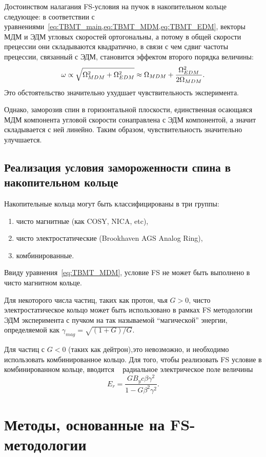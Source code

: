 Достоинством налагания FS-условия на пучок в накопительном кольце
следующее: в соответствии с
уравнениями~\cref{eq:TBMT_main,eq:TBMT_MDM,eq:TBMT_EDM}, векторы МДМ и
ЭДМ угловых скоростей ортогональны, а потому в общей скорости
прецессии они складываются квадратично, в связи с чем сдвиг частоты
прецессии, связанный с ЭДМ, становится эффектом второго порядка
величины:~\cite[стр.~5]{Mane:SpinWheel}
\[
\omega \propto \sqrt{\Omega_{MDM}^2 + \Omega_{EDM}^2} \approx \Omega_{MDM} + \frac{\Omega_{EDM}^2}{2\Omega_{MDM}}.
\]
Это обстоятельство значительно ухудшает чувствительность эксперимента.

Однако, заморозив спин в горизонтальной плоскости, единственная
осающаяся МДМ компонента угловой скорости сонаправлена с ЭДМ
компонентой, а значит складывается с ней линейно. Таким образом,
чувствительность значительно улучшается.

\subsection{Реализация условия замороженности спина в накопительном кольце}\label{sec:FS_in_a_ring}
Накопительные кольца могут быть классифицированы в три группы:
\begin{enumerate}
\item чисто магнитные (как COSY, NICA, etc),
\item чисто электростатические (Brookhaven AGS Analog Ring),
\item комбинированные.
\end{enumerate}

Ввиду уравнения~\eqref{eq:TBMT_MDM}, условие FS не может быть
выполнено в чисто магнитном кольце.

Для некоторого числа частиц, таких как протон, чья $G>0$, чисто
электростатическое кольцо может быть использовано в рамках FS
методологии ЭДМ эксперимента с пучком на так называемой ``магической''
энергии, определяемой как $\gamma_{mag} = \sqrt{(1+G)/G}$.

Для частиц с $G<0$ (таких как дейтрон),это невозможно, и необходимо
использовать комбинированное кольцо. Для того, чтобы реализовать FS
условие в комбинированном кольце, вводится ~\cite{BNL:Deuteron2008} радиальное электрическое
поле величины
\begin{equation}\label{eq:FS_Er}
  E_r = \frac{GB_yc\beta\gamma^2}{1-G\beta^2\gamma^2}.
\end{equation}

\section{Методы, основанные на FS-методологии} \label{sect1_2}
